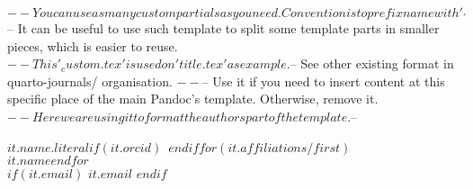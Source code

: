 $-- You can use as many custom partials as you need. Convention is to prefix name with '_'
$-- It can be useful to use such template to split some template parts in smaller pieces, which is easier to reuse.
$-- This '_custom.tex' is used on 'title.tex' as example.
$-- See other existing format in quarto-journals/ organisation.
$-- %
$-- Use it if you need to insert content at this specific place of the main Pandoc's template. Otherwise, remove it.
$-- Here we are using it to format the authors part of the template.
$-- %

{$it.name.literal$}$if(it.orcid)$~$endif$$for(it.affiliations/first)$\\[1ex]\normalsize $it.name$$endfor$\\
$if(it.email)$
\normalsize\href{mailto:$it.email$}{$it.email$}
$endif$



% 
% 
% 
